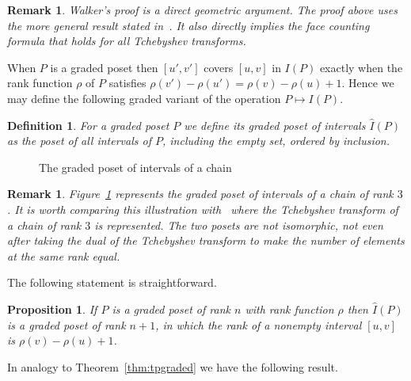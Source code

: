 \documentclass[reqno,12pt]{amsart}
\numberwithin{equation}{section}
\newtheorem{proposition}[theorem]{Proposition}
\newtheorem{definition}[theorem]{Definition}
\newtheorem{remark}[theorem]{Remark}
\newcommand{\0}{\widehat{0}}
\newcommand{\1}{\widehat{1}}
\newcommand{\2}{\widehat{2}}
\newcommand{\grI}{\widehat{I}}
\begin{document}
\begin{remark}
{\em Walker's proof is a direct geometric argument. The proof above uses
  the more general result stated in~\cite[Theorem 3.3]{Hetyei-Nevo}. It also
  directly implies the face counting formula that holds for all
  Tchebyshev transforms.}
\end{remark}  


When $P$ is a graded poset then $[u',v']$ covers $[u,v]$ in $I(P)$
exactly when the rank function $\rho$ of $P$ satisfies 
$\rho(v')-\rho(u')=\rho(v)-\rho(u)+1$. Hence we may define the following
graded variant of the operation $P\mapsto I(P)$.

\begin{definition}
For a graded poset $P$ we define its {\em graded poset of intervals
  $\grI(P)$} as the poset of all intervals of $P$, {\em including the
    empty set}, ordered by inclusion.
\end{definition}  

\begin{figure}[h]
  
\caption{The graded poset of intervals of a chain}  
\label{fig:gradedi}
\end{figure}

\begin{remark}
{\em Figure~\ref{fig:gradedi} represents the graded poset of intervals
  of a chain of rank $3$. It is worth comparing this illustration
  with~\cite[Figure 2]{Hetyei-mfp} where the Tchebyshev transform of a
  chain of rank $3$ is represented. The two posets are not isomorphic,
  not even after taking the dual of the Tchebyshev transform to make the
number of elements at the same rank equal.}
\end{remark}  

The following statement is straightforward.
\begin{proposition}
If $P$ is a graded poset of rank $n$ with rank function $\rho$ then
$\grI(P)$ is a graded poset of rank $n+1$, in which the rank of a
nonempty interval $[u,v]$ is $\rho(v)-\rho(u)+1$.
\end{proposition}  

In analogy to Theorem~\ref{thm:tpgraded} we have the following result.
\end{document}
